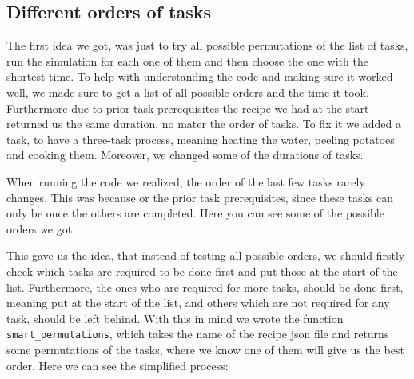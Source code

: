 \subsection{Different orders of tasks}
The first idea we got, was just to try all possible permutations of the list of tasks, run the simulation for each one of them and then choose the one with the shortest time.
To help with understanding the code and making sure it worked well, we made sure to get a list of all possible orders and the time it took. Furthermore due to prior task prerequisites the recipe we had at the start returned us the same duration, no mater the order of tasks. 
To fix it we added a task, to have a three-task process, meaning heating the water, peeling potatoes and cooking them. Moreover, we changed some of the durations of tasks. 

When running the code we realized, the order of the last few tasks rarely changes. This was because or the prior task prerequisites, since these tasks can only be once the others are completed.
Here you can see some of the possible orders we got. 

\begin{verbnobox} 
\end{verbnobox}

This gave us the idea, that instead of testing all possible orders, we should firstly check which tasks are required to be done first and put those at the start of the list. 
Furthermore, the ones who are required for more tasks, should be done first, meaning put at the start of the list, and others which are not required for any task, should be left behind.
With this in mind we wrote the function \texttt{smart\_permutations}, which takes the name of the recipe json file and returns some permutations of the tasks, where we know one of them will give us the best order. 
Here we can see the simplified process:

